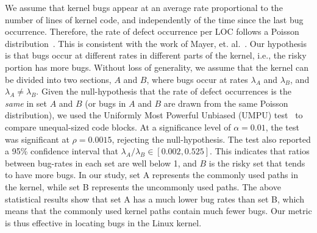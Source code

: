 We assume that kernel bugs appear at an average rate proportional to the
number of lines of kernel code, and independently of the time since the last
bug occurrence. Therefore, the rate of defect occurrence per LOC
follows a Poisson distribution~\cite{Poisson-distribution}.
This is consistent with the work of Mayer, et. al.~\cite{mayer1989probability}.
Our hypothesis is that bugs occur at different rates in different parts of the kernel, 
i.e., the risky portion has more bugs. Without
loss of generality, we assume that the kernel can be divided into two sections,
$A$ and $B$, where bugs occur at rates $\lambda_A$ and
$\lambda_B$, and $\lambda_A \neq \lambda_B$. Given the null-hypothesis
that the rate of defect occurrences is the \textit{same} in set $A$ and $B$
(or bugs in $A$ and $B$ are drawn from the same Poisson distribution),
we used the Uniformly Most Powerful Unbiased (UMPU) test~\cite{shiue1982experiment}
to compare unequal-sized code blocks.
At a significance level of $\alpha=0.01$, the test was significant at
$\rho=0.0015$, rejecting the null-hypothesis.
The test also reported a 95\% confidence interval that $\lambda_A / \lambda_B 
\in [0.002, 0.525]$. This indicates that ratios between bug-rates in each set are well
below 1, and $B$ is the risky set that tends to have more bugs. 
In our study, set A represents the commonly used paths in the kernel, while set B represents the uncommonly used paths. 
The above statistical results show that set A has a much lower bug rates than set B, which means that the commonly used kernel paths 
contain much fewer bugs. Our metric is thus effective in locating bugs in the Linux kernel. 

